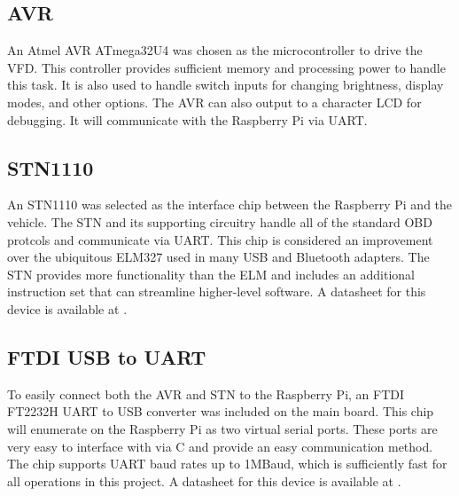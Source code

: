 \subsection{AVR}
An Atmel AVR ATmega32U4 \cite{atmega32u4ds} was chosen as the microcontroller to drive the VFD.  This
controller provides sufficient memory and processing power to handle this task. 
It is also used to handle switch inputs for changing brightness, display modes,
and other options.  The AVR can also output to a character LCD
for debugging.  It will communicate with the Raspberry Pi via UART.

\subsection{STN1110}
An STN1110 was selected as the interface chip between the Raspberry Pi and the 
vehicle.  The STN and its supporting circuitry handle all of the standard OBD
protcols and communicate via UART.  This chip is considered an improvement over
the ubiquitous ELM327 used in many USB and Bluetooth adapters.  The STN provides
more functionality than the ELM and includes an additional instruction set that
can streamline higher-level software. A datasheet for this device is available
at \cite{stn1110ds}.

\subsection{FTDI USB to UART}
To easily connect both the AVR and STN to the Raspberry Pi, an FTDI FT2232H UART 
to USB converter was included on the main board.  This chip will enumerate on the
Raspberry Pi as two virtual serial ports.  These ports are very easy to interface
with via C and provide an easy communication method.  The chip supports UART baud
rates up to 1MBaud, which is sufficiently fast for all operations in this project.
A datasheet for this device is available at \cite{ft2232hds}.

